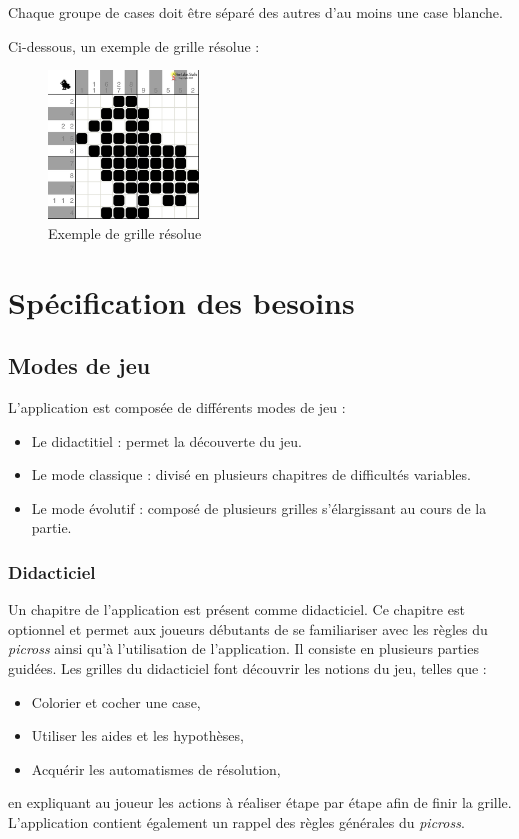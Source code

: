 \documentclass[a4paper, 12pt]{report}
\begin{document}
		Chaque groupe de cases doit être séparé des autres d'au moins une case blanche.
		
		Ci-dessous, un exemple de grille résolue :
		
	\begin{figure}[H]
		\centering
		\caption{Exemple de grille résolue}
		\includegraphics[width=4cm]{picross.png}
	\end{figure}
	

\chapter{Spécification des besoins}
\thispagestyle{empty}
\thispagestyle{plain}
\vspace*{0.5cm}

		\section{Modes de jeu}
		\vspace*{0.2cm}
		
			L'application est composée de différents modes de jeu :
			\begin{itemize}
            	\item Le didactitiel : permet la découverte du jeu.
            	\item Le mode classique : divisé en plusieurs chapitres de difficultés variables.
            	\item Le mode évolutif : composé de plusieurs grilles s'élargissant au cours de la partie.
        	\end{itemize}

	    \subsection{Didacticiel}
	    
		    Un chapitre de l'application est présent comme didacticiel. Ce chapitre est optionnel et permet aux joueurs   débutants de se familiariser avec les règles du \textit{picross} ainsi qu'à l'utilisation de l'application. Il consiste en plusieurs parties guidées. Les grilles du didacticiel font découvrir les notions du jeu, telles que :
		    \begin{itemize}
            	\item Colorier et cocher une case,
            	\item Utiliser les aides et les hypothèses,
            	\item Acquérir les automatismes de résolution,
        	\end{itemize}
		    en expliquant au joueur les actions à réaliser étape par étape afin de finir la grille. L'application contient également un rappel des règles générales du \textit{picross}.
		    
\end{document}

